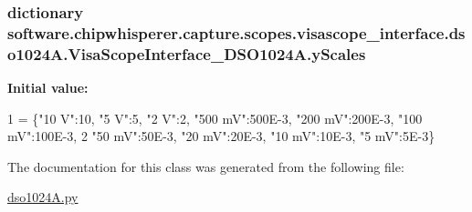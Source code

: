 \subsubsection[{y\+Scales}]{\setlength{\rightskip}{0pt plus 5cm}dictionary software.\+chipwhisperer.\+capture.\+scopes.\+visascope\+\_\+interface.\+dso1024\+A.\+Visa\+Scope\+Interface\+\_\+\+D\+S\+O1024\+A.\+y\+Scales\hspace{0.3cm}{\ttfamily [static]}}\label{classsoftware_1_1chipwhisperer_1_1capture_1_1scopes_1_1visascope__interface_1_1dso1024A_1_1VisaScopeInterface__DSO1024A_ae1b1484709c78000ec9c4c5bff986724}
{\bfseries Initial value\+:}
\begin{DoxyCode}
1 = \{\textcolor{stringliteral}{"10 V"}:10, \textcolor{stringliteral}{"5 V"}:5, \textcolor{stringliteral}{"2 V"}:2, \textcolor{stringliteral}{"500 mV"}:500E-3, \textcolor{stringliteral}{"200 mV"}:200E-3, \textcolor{stringliteral}{"100 mV"}:100E-3,
2                \textcolor{stringliteral}{"50 mV"}:50E-3, \textcolor{stringliteral}{"20 mV"}:20E-3, \textcolor{stringliteral}{"10 mV"}:10E-3, \textcolor{stringliteral}{"5 mV"}:5E-3\}
\end{DoxyCode}


The documentation for this class was generated from the following file\+:\begin{DoxyCompactItemize}
\item 
\hyperlink{dso1024A_8py}{dso1024\+A.\+py}\end{DoxyCompactItemize}
